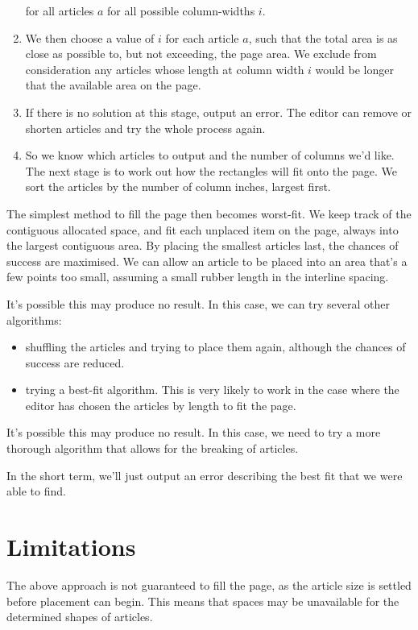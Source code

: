 \documentclass[a4paper]{scrartcl}
\begin{document}
\begin{enumerate}
      for all articles $a$ for all possible column-widths $i$.
    \item We then choose a value of $i$ for each article $a$, such
      that the total area is as close as possible to, but not
      exceeding, the page area. We exclude from consideration any
      articles whose length at column width $i$ would be longer that
      the available area on the page.
    \item If there is no solution at this stage, output an error. The
      editor can remove or shorten articles and try the whole process
      again.
    \item So we know which articles to output and the number of
      columns we'd like. The next stage is to work out how the
      rectangles will fit onto the page. We sort the articles by the
      number of column inches, largest first.
\end{enumerate}

The simplest method to fill the page then becomes worst-fit. We keep
track of the contiguous allocated space, and fit each unplaced item on
the page, always into the largest contiguous area. By placing the
smallest articles last, the chances of success are maximised. We can
allow an article to be placed into an area that's a few points too
small, assuming a small rubber length in the interline spacing.

It's possible this may produce no result. In this case, we can try
several other algorithms:

\begin{itemize}
  \item shuffling the articles and trying to place them again,
    although the chances of success are reduced.
  \item trying a best-fit algorithm. This is very likely to work in
    the case where the editor has chosen the articles by length to fit
    the page.
\end{itemize}

It's possible this may produce no result. In this case, we need to try
a more thorough algorithm that allows for the breaking of articles.

In the short term, we'll just output an error describing the best fit
that we were able to find.

\section*{Limitations}

The above approach is not guaranteed to fill the page, as the article
size is settled before placement can begin. This means that spaces may
be unavailable for the determined shapes of articles.
\end{document}

